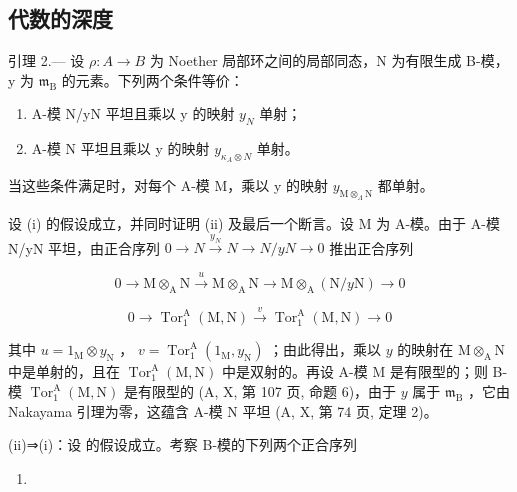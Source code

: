 \subsection{代数的深度}

引理 2.--- 设 \(\rho: A \to B\) 为 Noether 局部环之间的局部同态，N 为有限生成 B-模，y 为 \(\mathfrak{m}_{\mathrm{B}}\) 的元素。下列两个条件等价：

\begin{enumerate}
\def\labelenumi{(\roman{enumi})}
\item
  A-模 N/yN 平坦且乘以 y 的映射 \(y_{N}\) 单射；
\item
  A-模 N 平坦且乘以 y 的映射 \(y_{\kappa_{A}\otimes N}\) 单射。
\end{enumerate}

当这些条件满足时，对每个 A-模 M，乘以 y 的映射 \(y_{\mathrm{M} \otimes_{\Lambda}\mathrm{N}}\) 都单射。

设 (i) 的假设成立，并同时证明 (ii) 及最后一个断言。设 M 为 A-模。由于 A-模 N/yN 平坦，由正合序列 \(0 \rightarrow N \xrightarrow{y_{N}} N \longrightarrow N/yN \rightarrow 0\) 推出正合序列

\[
0 \rightarrow \mathrm{M} \otimes_ {\mathrm{A}} \mathrm{N} \xrightarrow {u} \mathrm{M} \otimes_ {\mathrm{A}} \mathrm{N} \longrightarrow \mathrm{M} \otimes_ {\mathrm{A}} (\mathrm{N} / y \mathrm{N}) \rightarrow 0
\]

\[
0 \to \operatorname{Tor} _ {1} ^ {\mathrm{A}} (\mathrm{M}, \mathrm{N}) \stackrel {v} {\longrightarrow} \operatorname{Tor} _ {1} ^ {\mathrm{A}} (\mathrm{M}, \mathrm{N}) \to 0
\]

其中 \(u = 1_{\mathrm{M}} \otimes y_{\mathrm{N}}\) ， \(v = \operatorname{Tor}_1^{\mathrm{A}}(1_{\mathrm{M}}, y_{\mathrm{N}})\) ；由此得出，乘以 \(y\) 的映射在 \(\mathrm{M} \otimes_{\mathrm{A}} \mathrm{N}\) 中是单射的，且在 \(\operatorname{Tor}_1^{\mathrm{A}}(\mathrm{M}, \mathrm{N})\) 中是双射的。再设 A-模 \(\mathrm{M}\) 是有限型的；则 B-模 \(\operatorname{Tor}_1^{\mathrm{A}}(\mathrm{M}, \mathrm{N})\) 是有限型的 (A, X, 第 107 页, 命题 6)，由于 \(y\) 属于 \(\mathfrak{m}_{\mathrm{B}}\) ，它由 Nakayama 引理为零，这蕴含 A-模 \(\mathrm{N}\) 平坦 (A, X, 第 74 页, 定理 2)。

(ii)⇒(i)：设 的假设成立。考察 B-模的下列两个正合序列

\begin{enumerate}
\def\labelenumi{(\arabic{enumi})}
\tightlist
\item
\end{enumerate}

